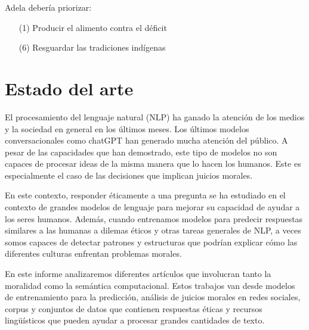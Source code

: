 \documentclass[
	spanish, %
	letterpaper, oneside
]{article}
\begin{document}
Adela debería priorizar:
\begin{itemize}
    \item[(1)] Producir el alimento contra el déficit
    \item[(6)] Resguardar las tradiciones indígenas
\end{itemize}


\section{Estado del arte}

El procesamiento del lenguaje natural (NLP) ha ganado la atención de los medios y la sociedad en general en los últimos meses. Los últimos modelos conversacionales como chatGPT han generado mucha atención del público. A pesar de las capacidades que han demostrado, este tipo de modelos no son capaces de procesar ideas de la misma manera que lo hacen los humanos. Este es especialmente el caso de las decisiones que implican juicios morales.

\newp En este contexto, responder éticamente a una pregunta se ha estudiado en el contexto de grandes modelos de lenguaje para mejorar su capacidad de ayudar a los seres humanos. Además, cuando entrenamos modelos para predecir respuestas similares a las humanas a dilemas éticos y otras tareas generales de NLP, a veces somos capaces de detectar patrones y estructuras que podrían explicar cómo las diferentes culturas enfrentan problemas morales.

\newp En este informe analizaremos diferentes artículos que involucran tanto la moralidad como la semántica computacional. Estos trabajos van desde modelos de entrenamiento para la predicción, análisis de juicios morales en redes sociales, corpus y conjuntos de datos que contienen respuestas éticas y recursos lingüísticos que pueden ayudar a procesar grandes cantidades de texto.
\end{document}
